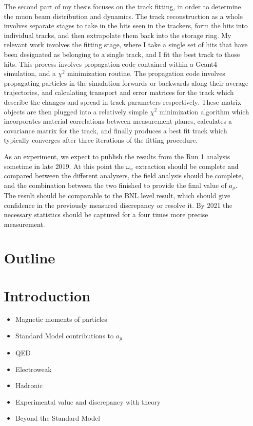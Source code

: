 \documentclass[12pt,letterpaper]{article}
\def\wa{$\omega_{a}$\xspace}
\def\chisq{$\chi^{2}$\xspace}
\def\amu{$a_{\mu}$\xspace}
\begin{document}
The second part of my thesis focuses on the track fitting, in order to determine the muon beam distribution and dynamics. The track reconstruction as a whole involves separate stages to take in the hits seen in the trackers, form the hits into individual tracks, and then extrapolate them back into the storage ring. My relevant work involves the fitting stage, where I take a single set of hits that have been designated as belonging to a single track, and I fit the best track to those hits. This process involves propagation code contained within a Geant4 simulation, and a \chisq minimization routine. The propagation code involves propagating particles in the simulation forwards or backwards along their average trajectories, and calculating transport and error matrices for the track which describe the changes and spread in track parameters respectively. These matrix objects are then plugged into a relatively simple \chisq minimization algorithm which incorporates material correlations between measurement planes, calculates a covariance matrix for the track, and finally produces a best fit track which typically converges after three iterations of the fitting procedure.


As an experiment, we expect to publish the results from the Run 1 analysis sometime in late 2019. At this point the \wa extraction should be complete and compared between the different analyzers, the field analysis should be complete, and the combination between the two finished to provide the final value of \amu. The result should be comparable to the BNL level result, which should give confidence in the previously measured discrepancy or resolve it. By 2021 the necessary statistics should be captured for a four times more precise measurement.



\section*{Outline}

\section{Introduction}

\begin{itemize}
	\item{Magnetic moments of particles}
	\item{Standard Model contributions to $a_{\mu}$}
	\item{QED}
	\item{Electroweak}
	\item{Hadronic}
	\item{Experimental value and discrepancy with theory}
	\item{Beyond the Standard Model}
\end{itemize}
\end{document}

